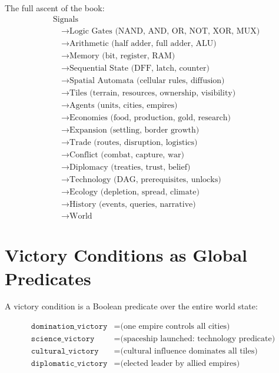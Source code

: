\documentclass[11pt,a4paper,openany]{book}
\theoremstyle{plain}
\theoremstyle{definition}
\theoremstyle{remark}
\begin{document}
The full ascent of the book:
\begin{align*}
  &\text{Signals} \\
  &\quad\to \text{Logic Gates (NAND, AND, OR, NOT, XOR, MUX)} \\
  &\quad\to \text{Arithmetic (half adder, full adder, ALU)} \\
  &\quad\to \text{Memory (bit, register, RAM)} \\
  &\quad\to \text{Sequential State (DFF, latch, counter)} \\
  &\quad\to \text{Spatial Automata (cellular rules, diffusion)} \\
  &\quad\to \text{Tiles (terrain, resources, ownership, visibility)} \\
  &\quad\to \text{Agents (units, cities, empires)} \\
  &\quad\to \text{Economies (food, production, gold, research)} \\
  &\quad\to \text{Expansion (settling, border growth)} \\
  &\quad\to \text{Trade (routes, disruption, logistics)} \\
  &\quad\to \text{Conflict (combat, capture, war)} \\
  &\quad\to \text{Diplomacy (treaties, trust, belief)} \\
  &\quad\to \text{Technology (DAG, prerequisites, unlocks)} \\
  &\quad\to \text{Ecology (depletion, spread, climate)} \\
  &\quad\to \text{History (events, queries, narrative)} \\
  &\quad\to \text{World}
\end{align*}

\section{Victory Conditions as Global Predicates}

A victory condition is a Boolean predicate over the entire world state:

\begin{align*}
  \texttt{domination\_victory} &= \text{(one empire controls all cities)} \\
  \texttt{science\_victory} &= \text{(spaceship launched: technology predicate)} \\
  \texttt{cultural\_victory} &= \text{(cultural influence dominates all tiles)} \\
  \texttt{diplomatic\_victory} &= \text{(elected leader by allied empires)}
\end{align*}
\end{document}

